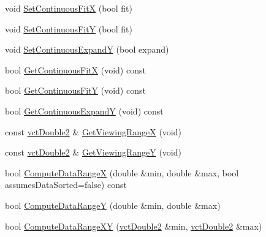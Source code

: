 {\bf }\par
\begin{DoxyCompactItemize}
\item 
void \hyperlink{classvct_plot2_d_base_1_1_scale_aea5c908466465711922ceaa8245bb96f}{Set\-Continuous\-Fit\-X} (bool fit)
\item 
void \hyperlink{classvct_plot2_d_base_1_1_scale_a860a6e558da6149c743e6fc60f90f744}{Set\-Continuous\-Fit\-Y} (bool fit)
\item 
void \hyperlink{classvct_plot2_d_base_1_1_scale_a0a1358c1d3f86a3e07edc4f2ee5264bf}{Set\-Continuous\-Expand\-Y} (bool expand)
\end{DoxyCompactItemize}

{\bf }\par
\begin{DoxyCompactItemize}
\item 
bool \hyperlink{classvct_plot2_d_base_1_1_scale_adcc4dbccfa311a0c353dfdab8be300a9}{Get\-Continuous\-Fit\-X} (void) const 
\item 
bool \hyperlink{classvct_plot2_d_base_1_1_scale_a1834c8b58a055af01b0dc3cf416f0e3a}{Get\-Continuous\-Fit\-Y} (void) const 
\item 
bool \hyperlink{classvct_plot2_d_base_1_1_scale_aa776dec8e6ab48ea4e750d5087b51e2f}{Get\-Continuous\-Expand\-Y} (void) const 
\item 
const \hyperlink{vct_fixed_size_vector_types_8h_afc0fdcc41cbe8b043747612501610812}{vct\-Double2} \& \hyperlink{classvct_plot2_d_base_1_1_scale_ae94065727370a80270300269cf80f79f}{Get\-Viewing\-Range\-X} (void)
\item 
const \hyperlink{vct_fixed_size_vector_types_8h_afc0fdcc41cbe8b043747612501610812}{vct\-Double2} \& \hyperlink{classvct_plot2_d_base_1_1_scale_a3b2b5ab13e443cc3020e251a8a039214}{Get\-Viewing\-Range\-Y} (void)
\end{DoxyCompactItemize}

{\bf }\par
\begin{DoxyCompactItemize}
\item 
bool \hyperlink{classvct_plot2_d_base_1_1_scale_a084a67fb1d9f2e88b5f112420ac67ff1}{Compute\-Data\-Range\-X} (double \&min, double \&max, bool assumes\-Data\-Sorted=false) const 
\item 
bool \hyperlink{classvct_plot2_d_base_1_1_scale_a9f3e0aac2072a067b34af58353f9c58f}{Compute\-Data\-Range\-Y} (double \&min, double \&max)
\item 
bool \hyperlink{classvct_plot2_d_base_1_1_scale_a6112d224229d6dadf22f4185cc6b3f0d}{Compute\-Data\-Range\-X\-Y} (\hyperlink{vct_fixed_size_vector_types_8h_afc0fdcc41cbe8b043747612501610812}{vct\-Double2} \&min, \hyperlink{vct_fixed_size_vector_types_8h_afc0fdcc41cbe8b043747612501610812}{vct\-Double2} \&max)
\end{DoxyCompactItemize}

